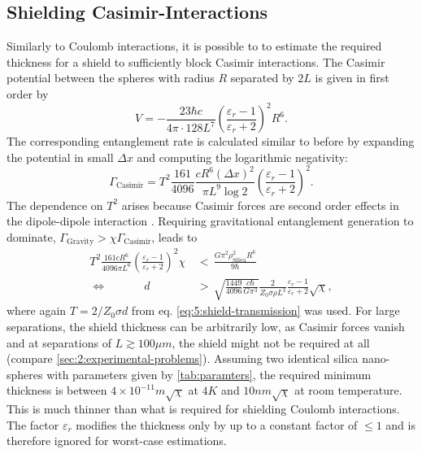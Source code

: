 \subsection{Shielding Casimir-Interactions}
Similarly to Coulomb interactions, it is possible to to estimate the required thickness for a shield to sufficiently block Casimir interactions.
The Casimir potential between the spheres with radius $R$ separated by $2L$ is given in first order by \cite{Emig_2007}
\begin{equation}
  V = -\frac{23 \hbar c}{4\pi \cdot 128 L^7} \left( \frac{\varepsilon_r - 1}{\varepsilon_r + 2} \right)^2 R^6 .
\end{equation}
The corresponding entanglement rate is calculated similar to before by expanding the potential in small $\Delta x$ and computing the logarithmic negativity:
\begin{equation}
  \Gamma_\mathrm{Casimir} = T^2 \frac{161}{4096} \frac{c R^6 (\Delta x)^2}{\pi L^9 \log 2}\left( \frac{\varepsilon_r - 1}{\varepsilon_r + 2}\right)^2 .
\end{equation}
The dependence on $T^2$ arises because Casimir forces are second order effects in the dipole-dipole interaction \cite{Bordag_2001}.
Requiring gravitational entanglement generation to dominate, $\Gamma_\mathrm{Gravity} > \chi \Gamma_\mathrm{Casimir}$, leads to
\begin{align}
  T^2 \frac{161 c R^6}{4096 \pi L^6} \left( \frac{\varepsilon_r - 1}{\varepsilon_r + 2}\right)^2 \chi \, &< \, \frac{G \pi^2 \rho_\mathrm{Silica}^2 R^6}{9\hbar} \\
  \Longleftrightarrow \quad\quad\quad\  d \, &> \, \sqrt{\frac{1449}{4096} \frac{c \hbar}{G \pi^3}} \frac{2}{Z_0 \sigma \rho L^3} \frac{\varepsilon_r - 1}{\varepsilon_r + 2} \sqrt{\chi} ,
\end{align}
where again $T = 2/Z_0 \sigma d$ from eq. \eqref{eq:5:shield-transmission} was used.
For large separations, the shield thickness can be arbitrarily low, as Casimir forces vanish and at separations of $L\gtrsim 100\si{\mu m}$, the shield might not be required at all (compare \cref{sec:2:experimental-problems}).
Assuming two identical silica nano-spheres with parameters given by \cref{tab:paramters}, the required minimum thickness is between $4\times 10^{-11}\si{m} \sqrt{\chi}$ at $4\si{K}$ and $10 \si{nm} \sqrt{\chi}$ at room temperature.
This is much thinner than what is required for shielding Coulomb interactions.
The factor $\varepsilon_r$ modifies the thickness only by up to a constant factor of $\leq 1$ and is therefore ignored for worst-case estimations.

